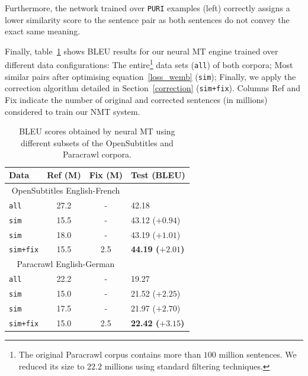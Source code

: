\documentclass[11pt,a4paper]{article}
\begin{document}
Furthermore, the network trained over \texttt{PURI} examples (left) correctly assigns a lower similarity score to the sentence pair as both sentences do not convey the exact same meaning.

Finally, table~\ref{results} shows BLEU results for our neural MT engine trained over different data configurations:
The entire\footnote{The original Paracrawl corpus contains more than $100$ million sentences. We reduced its size to $22.2$ millions using standard filtering techniques.} data sets (\texttt{all}) of both corpora; 
Most similar pairs after optimising equation~\ref{loss_wemb} (\texttt{sim}); 
Finally, we apply the correction algorithm detailed in Section~\ref{correction} (\texttt{sim+fix}).
Columns Ref and Fix indicate the number of original and corrected sentences (in millions) considered to train our NMT system.

\begin{table}[h!]
\small
\center
\begin{tabular}{lccl}
\hline
\bf Data & \bf Ref (M) & \bf Fix (M) & \bf Test (BLEU) \\ %
\hline
\multicolumn{3}{c}{\scriptsize{OpenSubtitles English-French}} \\
\texttt{all}                   & 27.2 & - & 42.18 \\
\texttt{sim}            & 15.5 & - & 43.12  ($+0.94$)\\
\texttt{sim}           & 18.0 & - & 43.19  ($+1.01$)\\
\texttt{sim+fix}     & 15.5 & 2.5 & \bf 44.19 ($+2.01$)\\
\hline
\multicolumn{3}{c}{\scriptsize{Paracrawl English-German}} \\
\texttt{all}                  & 22.2 & - & 19.27 \\ 
\texttt{sim}           & 15.0 & - & 21.52 ($+2.25$)\\
\texttt{sim}           & 17.5 & - & 21.97 ($+2.70$)\\
\texttt{sim+fix}   & 15.0 & 2.5 & \bf 22.42 ($+3.15$) \\
\hline
\end{tabular}
\caption{BLEU scores obtained by neural MT using different subsets of the OpenSubtitles and Paracrawl corpora.}
\label{results}
\end{table}
\end{document}
